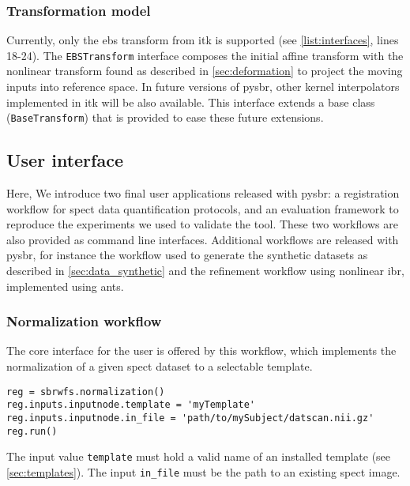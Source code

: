 \documentclass{frontiers}
\begin{document}
\subsubsection{Transformation model} %
Currently, only the \gls*{ebs} transform from \gls*{itk} is supported
  (see \autoref{list:interfaces}, lines 18-24).
The \texttt{EBSTransform} interface composes the initial affine transform
  with the nonlinear transform found as described in \autoref{sec:deformation}
  to project the moving inputs into reference space.
In future versions of \gls*{pysbr}, other kernel interpolators implemented in \gls*{itk} 
  will be also available.
This interface extends a base class (\texttt{BaseTransform}) that is provided to
  ease these future extensions.


\subsection{User interface}
\label{sec:user_interface}

Here, We introduce two final user
  applications released with \gls*{pysbr}: a registration workflow for
  \gls*{spect} data quantification protocols, and an evaluation framework
  to reproduce the experiments we used to validate the tool.
These two workflows are also provided as command line interfaces.
Additional workflows are released with \gls*{pysbr}, for instance
  the workflow used to generate the synthetic datasets as described
  in \autoref{sec:data_synthetic} and the refinement workflow using
  nonlinear \gls*{ibr}, implemented using \gls*{ants}.

\subsubsection{Normalization workflow} %
The core interface for the user is offered by this workflow,
  which implements the normalization of a given \gls*{spect} 
  dataset to a selectable template.
\begin{lstlisting}[float,caption={\label{list:fullreg}Running a full template-subject registration}]
reg = sbrwfs.normalization()
reg.inputs.inputnode.template = 'myTemplate'
reg.inputs.inputnode.in_file = 'path/to/mySubject/datscan.nii.gz'
reg.run()
\end{lstlisting}
The input value \texttt{template} must hold a valid name of an installed 
  template (see \autoref{sec:templates}). 
The input \texttt{in\_file} must be the path to an existing \gls*{spect} image.
\end{document}
